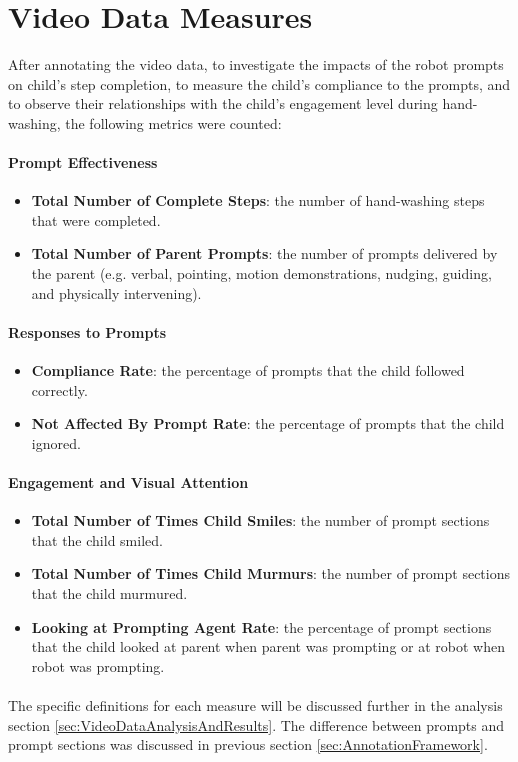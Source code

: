 \section{Video Data Measures}
\label{sec:measures}
After annotating the video data, to investigate the impacts of the robot prompts on child's step completion, to measure the child's compliance to the prompts, and to observe their relationships with the child's engagement level during hand-washing, the following metrics were counted:

\paragraph{Prompt Effectiveness}
\begin{itemize}
	\item \textbf{Total Number of Complete Steps}: the number of hand-washing steps that were completed.
	\item \textbf{Total Number of Parent Prompts}: the number of prompts delivered by the parent (e.g. verbal, pointing, motion demonstrations, nudging, guiding, and physically intervening).
\end{itemize}

\paragraph{Responses to Prompts}
\begin{itemize}
	\item \textbf{Compliance Rate}: the percentage of prompts that the child followed correctly.
	\item \textbf{Not Affected By Prompt Rate}: the percentage of prompts that the child ignored.
\end{itemize}

\paragraph{Engagement and Visual Attention}
\begin{itemize}
	\item \textbf{Total Number of Times Child Smiles}: the number of prompt sections that the child smiled.
	\item \textbf{Total Number of Times Child Murmurs}: the number of prompt sections that the child murmured.
	\item \textbf{Looking at Prompting Agent Rate}: the percentage of prompt sections that the child looked at parent when parent was prompting or at robot when robot was prompting.
\end{itemize}

\paragraph{} %
The specific definitions for each measure will be discussed further in the analysis section \ref{sec:VideoDataAnalysisAndResults}.  The difference between prompts and prompt sections was discussed in previous section \ref{sec:AnnotationFramework}.
